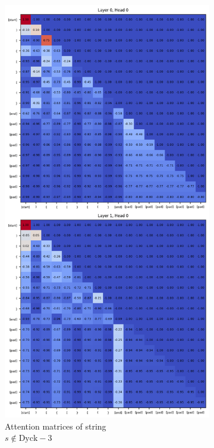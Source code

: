 \begin{figure}[h]
    \centering
    \begin{subfigure}{.5\textwidth}
      \centering
      \includegraphics[width=.8\linewidth]{docs/figs/dyck_3/causal_seq_1_dyck_3.png}
      \caption{Attention matrices of string \\ $s \notin \text{Dyck}-3$}
      \label{fig:neg-causal-dyck-3}
    \end{subfigure}%
    \begin{subfigure}{.5\textwidth}
      \centering

\end{subfigure}
\end{figure}
